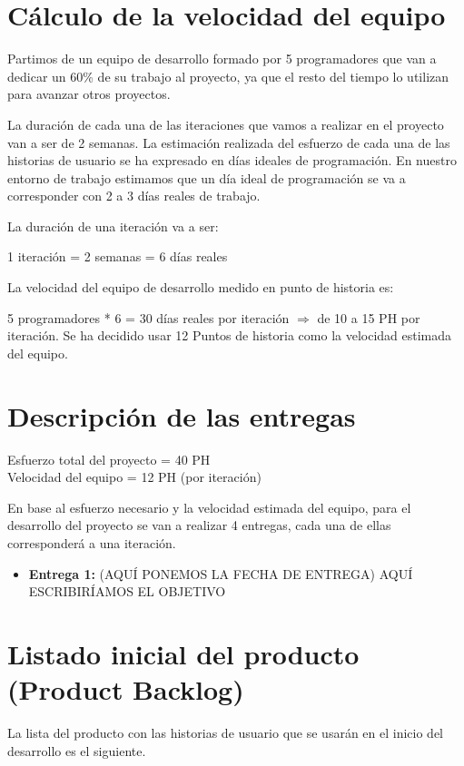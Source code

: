 \documentclass[11pt]{article}
\begin{document}
\section{Cálculo de la velocidad del equipo}
Partimos de un equipo de desarrollo formado  por 5 programadores  que van a dedicar un 60\% de su trabajo al proyecto, ya que el resto del tiempo lo utilizan para avanzar otros proyectos. 

La duración de cada una de las iteraciones que vamos a realizar en el proyecto van a ser de 2 semanas. 
La estimación realizada del esfuerzo de cada una de las historias de usuario se ha expresado en días ideales de programación. En nuestro
entorno de trabajo estimamos que un día ideal de programación se va a corresponder con 2 a 3 días reales de trabajo. 

La duración de una iteración va a ser: 

1 iteración = 2 semanas = 6 días reales 

La velocidad del equipo de desarrollo medido en punto de historia es:  

5 programadores * 6 = 30 días reales por iteración $\Longrightarrow$ de 10 a 15 PH por iteración.  
Se ha decidido usar 12 Puntos de historia como la velocidad estimada del equipo. 

\section{Descripción de las entregas}

Esfuerzo total del proyecto = 40 PH \\
Velocidad del equipo = 12 PH (por iteración) 

En base al esfuerzo necesario y la velocidad estimada del equipo, para el desarrollo del proyecto se van a realizar 4 entregas, cada una de ellas corresponderá a una iteración.
\begin{itemize}
\item \textbf{Entrega 1:} (AQUÍ PONEMOS LA FECHA DE ENTREGA) AQUÍ ESCRIBIRÍAMOS EL OBJETIVO


\end{itemize}
\section{Listado inicial del producto (Product Backlog)}
La lista del producto con las historias de usuario que se usarán en el inicio del desarrollo es el siguiente.
\end{document}
